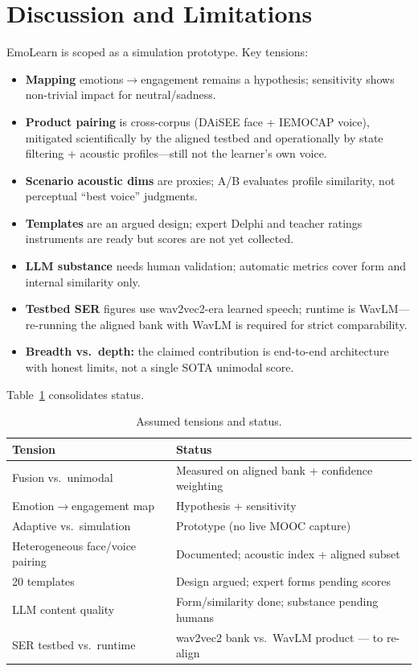 \documentclass[conference]{IEEEtran}
\begin{document}
\section{Discussion and Limitations}
\label{sec:discussion}

EmoLearn is scoped as a simulation prototype. Key tensions:

\begin{itemize}
\item \textbf{Mapping} emotions$\rightarrow$engagement remains a hypothesis;
sensitivity shows non-trivial impact for neutral/sadness.
\item \textbf{Product pairing} is cross-corpus (DAiSEE face + IEMOCAP voice),
mitigated scientifically by the aligned testbed and operationally by state
filtering + acoustic profiles---still not the learner's own voice.
\item \textbf{Scenario acoustic dims} are proxies; A/B evaluates profile
similarity, not perceptual ``best voice'' judgments.
\item \textbf{Templates} are an argued design; expert Delphi and teacher
ratings instruments are ready but scores are not yet collected.
\item \textbf{LLM substance} needs human validation; automatic metrics cover
form and internal similarity only.
\item \textbf{Testbed SER} figures use wav2vec2-era learned speech; runtime is
WavLM---re-running the aligned bank with WavLM is required for strict
comparability.
\item \textbf{Breadth vs.\ depth:} the claimed contribution is end-to-end
architecture with honest limits, not a single SOTA unimodal score.
\end{itemize}

Table~\ref{tab:limits} consolidates status.

\begin{table}[!t]
\caption{Assumed tensions and status.}
\label{tab:limits}
\centering
\begin{tabular}{@{}p{}p{}@{}}
\toprule
\textbf{Tension} & \textbf{Status} \\
\midrule
Fusion vs.\ unimodal & Measured on aligned bank + confidence weighting \\
Emotion$\rightarrow$engagement map & Hypothesis + sensitivity \\
Adaptive vs.\ simulation & Prototype (no live MOOC capture) \\
Heterogeneous face/voice pairing & Documented; acoustic index + aligned subset \\
20 templates & Design argued; expert forms pending scores \\
LLM content quality & Form/similarity done; substance pending humans \\
SER testbed vs.\ runtime & wav2vec2 bank vs.\ WavLM product --- to re-align \\
\bottomrule
\end{tabular}
\end{table}
\end{document}
